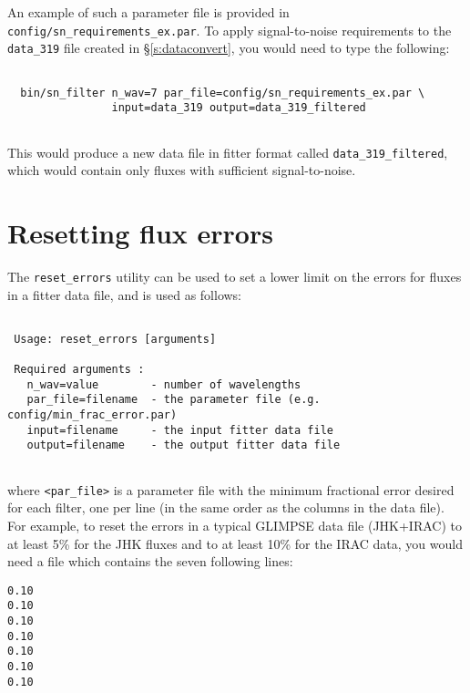 \documentclass[letterpaper,11pt]{report}
\begin{document}
An example of such a parameter file is provided in \texttt{config/sn\_requirements\_ex.par}. To apply signal-to-noise requirements to the \texttt{data\_319} file created in \S\ref{s:dataconvert}, you would need to type the following:

\begin{Verbatim}[frame=single,label=Example]

  bin/sn_filter n_wav=7 par_file=config/sn_requirements_ex.par \
                input=data_319 output=data_319_filtered
  
\end{Verbatim}

This would produce a new data file in fitter format called \texttt{data\_319\_filtered}, which would contain only fluxes with sufficient signal-to-noise.

\section{Resetting flux errors}
\label{s:errorsreset}

The \texttt{reset\_errors} utility can be used to set a lower limit on the errors for fluxes in a fitter data file, and is used as follows:\\

\begin{Verbatim}[frame=single,label=Syntax]

 Usage: reset_errors [arguments]
 
 Required arguments :
   n_wav=value        - number of wavelengths
   par_file=filename  - the parameter file (e.g. config/min_frac_error.par)
   input=filename     - the input fitter data file
   output=filename    - the output fitter data file
   
\end{Verbatim}

where \texttt{<par\_file>} is a parameter file with the minimum fractional error desired for each filter, one per line (in the same order as the columns in the data file).\\

For example, to reset the errors in a typical GLIMPSE data file (JHK+IRAC) to at least 5\% for the JHK fluxes and to at least 10\% for the IRAC data, you would need a file which contains the seven following lines:

\begin{verbatim}
0.10
0.10
0.10
0.10
0.10
0.10
0.10
\end{verbatim}
\end{document}
